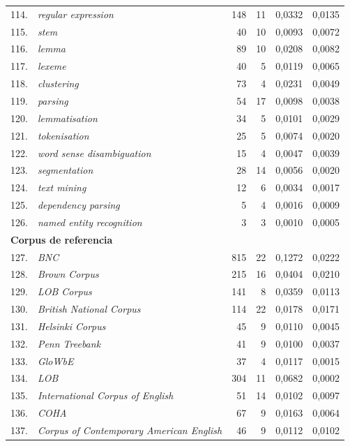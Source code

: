 \begin{longtable}{@{} r p{5cm} r r r r @{}}
114. & \textit{regular expression} & 148 & 11 & 0{,}0332 & 0{,}0135 \\
115. & \textit{stem} & 40 & 10 & 0{,}0093 & 0{,}0072 \\
116. & \textit{lemma} & 89 & 10 & 0{,}0208 & 0{,}0082 \\
117. & \textit{lexeme} & 40 & 5 & 0{,}0119 & 0{,}0065 \\
118. & \textit{clustering} & 73 & 4 & 0{,}0231 & 0{,}0049 \\
119. & \textit{parsing} & 54 & 17 & 0{,}0098 & 0{,}0038 \\
120. & \textit{lemmatisation} & 34 & 5 & 0{,}0101 & 0{,}0029 \\
121. & \textit{tokenisation} & 25 & 5 & 0{,}0074 & 0{,}0020 \\
122. & \textit{word sense disambiguation} & 15 & 4 & 0{,}0047 & 0{,}0039 \\
123. & \textit{segmentation} & 28 & 14 & 0{,}0056 & 0{,}0020 \\
124. & \textit{text mining} & 12 & 6 & 0{,}0034 & 0{,}0017 \\
125. & \textit{dependency parsing} & 5 & 4 & 0{,}0016 & 0{,}0009 \\
126. & \textit{named entity recognition} & 3 & 3 & 0{,}0010 & 0{,}0005 \\
\midrule
\multicolumn{6}{l}{\textbf{Corpus de referencia}} \\
\midrule
127. & \textit{BNC} & 815 & 22 & 0{,}1272 & 0{,}0222 \\
128. & \textit{Brown Corpus} & 215 & 16 & 0{,}0404 & 0{,}0210 \\
129. & \textit{LOB Corpus} & 141 & 8 & 0{,}0359 & 0{,}0113 \\
130. & \textit{British National Corpus} & 114 & 22 & 0{,}0178 & 0{,}0171 \\
131. & \textit{Helsinki Corpus} & 45 & 9 & 0{,}0110 & 0{,}0045 \\
132. & \textit{Penn Treebank} & 41 & 9 & 0{,}0100 & 0{,}0037 \\
133. & \textit{GloWbE} & 37 & 4 & 0{,}0117 & 0{,}0015 \\
134. & \textit{LOB} & 304 & 11 & 0{,}0682 & 0{,}0002 \\
135. & \textit{International Corpus of English} & 51 & 14 & 0{,}0102 & 0{,}0097 \\
136. & \textit{COHA} & 67 & 9 & 0{,}0163 & 0{,}0064 \\
137. & \textit{Corpus of Contemporary American English} & 46 & 9 & 0{,}0112 & 0{,}0102 \\

\end{longtable}
